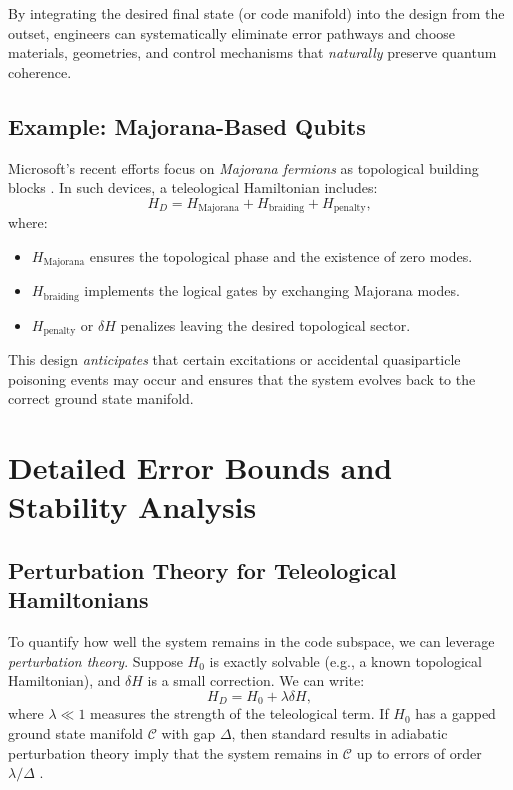 \documentclass[11pt]{article}
\begin{document}
By integrating the desired final state (or code manifold) into the design from the outset, engineers can systematically eliminate error pathways and choose materials, geometries, and control mechanisms that \emph{naturally} preserve quantum coherence.

\subsection{Example: Majorana-Based Qubits}
Microsoft’s recent efforts focus on \emph{Majorana fermions} as topological building blocks \cite{MicrosoftMajorana}. In such devices, a teleological Hamiltonian includes:
\begin{equation}
H_D = H_{\mathrm{Majorana}} + H_{\mathrm{braiding}} + H_{\mathrm{penalty}},
\end{equation}
where:
\begin{itemize}
\item $H_{\mathrm{Majorana}}$ ensures the topological phase and the existence of zero modes.
\item $H_{\mathrm{braiding}}$ implements the logical gates by exchanging Majorana modes.
\item $H_{\mathrm{penalty}}$ or $\delta H$ penalizes leaving the desired topological sector.
\end{itemize}

This design \emph{anticipates} that certain excitations or accidental quasiparticle poisoning events may occur and ensures that the system evolves back to the correct ground state manifold.

\section{Detailed Error Bounds and Stability Analysis}
\subsection{Perturbation Theory for Teleological Hamiltonians}
To quantify how well the system remains in the code subspace, we can leverage \emph{perturbation theory}. Suppose $H_0$ is exactly solvable (e.g., a known topological Hamiltonian), and $\delta H$ is a small correction. We can write:
\begin{equation}
H_D = H_0 + \lambda \delta H,
\end{equation}
where $\lambda \ll 1$ measures the strength of the teleological term. If $H_0$ has a gapped ground state manifold $\mathcal{C}$ with gap $\Delta$, then standard results in adiabatic perturbation theory imply that the system remains in $\mathcal{C}$ up to errors of order $\lambda/\Delta$ \cite{bravyi2006lieb}.
\end{document}

